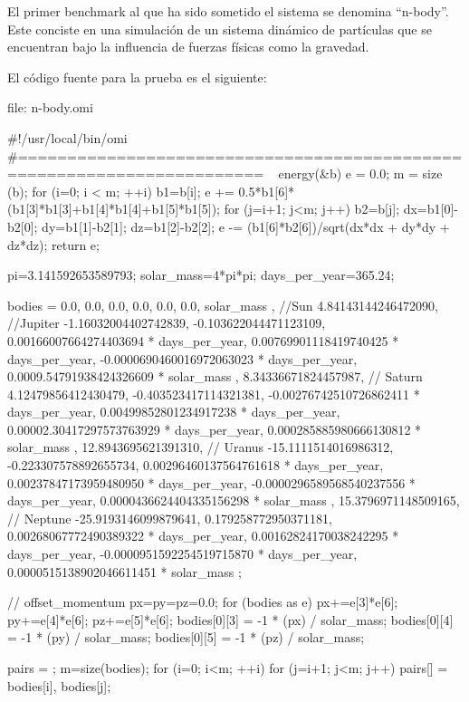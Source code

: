 El primer benchmark al que ha sido sometido el sistema se denomina ``n-body''. Este conciste en una simulación de un sistema dinámico de
partículas que se encuentran bajo la influencia de fuerzas físicas como la gravedad. 

El código fuente para la prueba es el siguiente: 

file: n-body.omi
\begin{myverbatim}
#!/usr/local/bin/omi
#=======================================================================
~ energy(&b) {
   e = 0.0;
   m = size (b);
   for (i=0; i < m; ++i) {
       b1=b[i]; 
       e += 0.5*b1[6]*(b1[3]*b1[3]+b1[4]*b1[4]+b1[5]*b1[5]);
       for (j=i+1; j<m; j++) {
         b2=b[j];
         dx=b1[0]-b2[0]; dy=b1[1]-b2[1]; dz=b1[2]-b2[2];
         e -= (b1[6]*b2[6])/sqrt(dx*dx + dy*dy + dz*dz);
       }
   }
   return e;
}

pi=3.141592653589793;
solar_mass=4*pi*pi;
days_per_year=365.24;

bodies = {
   {0.0, 0.0, 0.0, 0.0, 0.0, 0.0, solar_mass }, //Sun
   { 
      4.84143144246472090, //Jupiter
      -1.16032004402742839,
      -0.103622044471123109,
      0.00166007664274403694 * days_per_year,
      0.00769901118419740425 * days_per_year,
      -0.0000690460016972063023 * days_per_year,
      0.0009.54791938424326609 * solar_mass
   },
   {
      8.34336671824457987,    // Saturn
      4.12479856412430479,
      -0.403523417114321381,
      -0.00276742510726862411 * days_per_year,
      0.00499852801234917238 * days_per_year,
      0.00002.30417297573763929 * days_per_year,
      0.000285885980666130812 * solar_mass
   },
   {
      12.8943695621391310, // Uranus
      -15.1111514016986312,
      -0.223307578892655734,
      0.00296460137564761618 * days_per_year,
      0.00237847173959480950 * days_per_year,
      -0.0000296589568540237556 * days_per_year,
      0.0000436624404335156298 * solar_mass
   },
   {
      15.3796971148509165, // Neptune
      -25.9193146099879641,
      0.179258772950371181,
      0.00268067772490389322 * days_per_year,
      0.00162824170038242295 * days_per_year,
      -0.0000951592254519715870 * days_per_year,
      0.0000515138902046611451 * solar_mass
   }
};

// offset_momentum
px=py=pz=0.0;
for (bodies as e) {
    px+=e[3]*e[6]; 
    py+=e[4]*e[6]; 
    pz+=e[5]*e[6];
} 
bodies[0][3] = -1 * (px) / solar_mass;
bodies[0][4] = -1 * (py) / solar_mass;
bodies[0][5] = -1 * (pz) / solar_mass;

pairs = {};
m=size(bodies);
for (i=0; i<m; ++i) 
   for (j=i+1; j<m; j++) 
      pairs[] = {bodies[i], bodies[j]};


\end{myverbatim}
